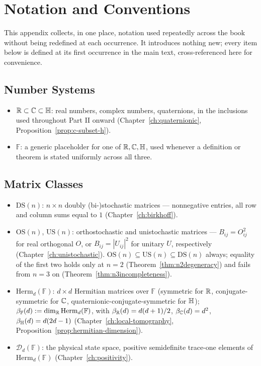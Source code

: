 \chapter{Notation and Conventions}
\label{app:notation}

This appendix collects, in one place, notation used repeatedly across the
book without being redefined at each occurrence. It introduces nothing
new; every item below is defined at its first occurrence in the main text,
cross-referenced here for convenience.

\section{Number Systems}
\begin{itemize}
\item[] $\mathbb{R} \subset \mathbb{C} \subset \mathbb{H}$: real numbers, complex numbers,
quaternions, in the inclusions used throughout Part II onward
(Chapter~\ref{ch:quaternionic}, Proposition~\ref{prop:c-subset-h}).
\item[] $\mathbb F$: a generic placeholder for one of $\mathbb{R},\mathbb{C},\mathbb{H}$, used
whenever a definition or theorem is stated uniformly across all three.
\end{itemize}

\section{Matrix Classes}
\begin{itemize}
\item[] $\mathrm{DS}(n)$: $n\times n$ doubly (bi-)stochastic matrices —
nonnegative entries, all row and column sums equal to $1$
(Chapter~\ref{ch:birkhoff}).
\item[] $\mathrm{OS}(n)$, $\mathrm{US}(n)$: orthostochastic and
unistochastic matrices — $B_{ij}=O_{ij}^2$ for real orthogonal $O$, or
$B_{ij}=|U_{ij}|^2$ for unitary $U$, respectively
(Chapter~\ref{ch:unistochastic}). $\mathrm{OS}(n) \subseteq
\mathrm{US}(n) \subseteq \mathrm{DS}(n)$ always; equality of the first two
holds only at $n=2$ (Theorem~\ref{thm:n2degeneracy}) and fails from $n=3$
on (Theorem~\ref{thm:n3incompleteness}).
\item[] $\mathrm{Herm}_d(\mathbb F)$: $d\times d$ Hermitian matrices over
$\mathbb F$ (symmetric for $\mathbb{R}$, conjugate-symmetric for $\mathbb{C}$,
quaternionic-conjugate-symmetric for $\mathbb{H}$); $\beta_{\mathbb F}(d) :=
\dim_{\mathbb{R}} \mathrm{Herm}_d(\mathbb F)$, with $\beta_{\mathbb{R}}(d)=d(d+1)/2$,
$\beta_{\mathbb{C}}(d)=d^2$, $\beta_{\mathbb{H}}(d)=d(2d-1)$
(Chapter~\ref{ch:local-tomography}, Proposition~\ref{prop:hermitian-dimension}).
\item[] $\mathcal D_d(\mathbb F)$: the physical state space, positive
semidefinite trace-one elements of $\mathrm{Herm}_d(\mathbb F)$
(Chapter~\ref{ch:positivity}).
\end{itemize}

